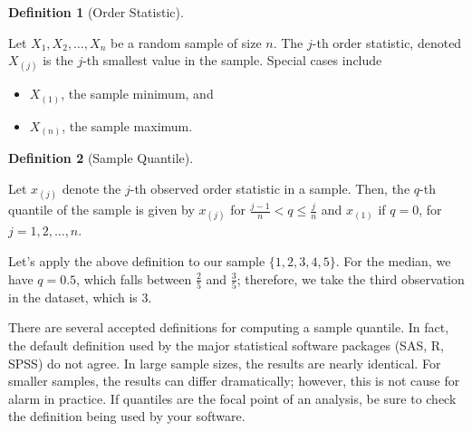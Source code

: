 \documentclass[
  letterpaper,
  DIV=11,
  numbers=noendperiod]{scrreprt}
\providecommand{\tightlist}{%
  \setlength{\itemsep}{0pt}\setlength{\parskip}{0pt}}\usepackage{longtable,booktabs,array}
\theoremstyle{plain}
\theoremstyle{definition}
\newtheorem{definition}{Definition}[chapter]
\theoremstyle{definition}
\theoremstyle{remark}
\begin{document}
\begin{definition}[Order
Statistic]\protect\hypertarget{def-order-statistic}{}\label{def-order-statistic}

Let \(X_1, X_2, \dotsc, X_n\) be a random sample of size \(n\). The
\(j\)-th order statistic, denoted \(X_{(j)}\) is the \(j\)-th smallest
value in the sample. Special cases include

\begin{itemize}
\tightlist
\item
  \(X_{(1)}\), the sample minimum, and
\item
  \(X_{(n)}\), the sample maximum.
\end{itemize}

\end{definition}

\begin{definition}[Sample
Quantile]\protect\hypertarget{def-sample-quantile}{}\label{def-sample-quantile}

Let \(x_{(j)}\) denote the \(j\)-th observed order statistic in a
sample. Then, the \(q\)-th quantile of the sample is given by
\(x_{(j)}\) for \(\frac{j-1}{n} < q \leq \frac{j}{n}\) and \(x_{(1)}\)
if \(q = 0\), for \(j=1,2,\dotsc,n\).

\end{definition}

Let's apply the above definition to our sample \(\{1, 2, 3, 4, 5\}\).
For the median, we have \(q = 0.5\), which falls between \(\frac{2}{5}\)
and \(\frac{3}{5}\); therefore, we take the third observation in the
dataset, which is 3.

\begin{tcolorbox}[enhanced jigsaw, toprule=.15mm, left=2mm, title=\textcolor{quarto-callout-note-color}{\faInfo}\hspace{0.5em}{Note}, opacityback=0, toptitle=1mm, leftrule=.75mm, colbacktitle=quarto-callout-note-color!10!white, opacitybacktitle=0.6, titlerule=0mm, breakable, colframe=quarto-callout-note-color-frame, arc=.35mm, coltitle=black, bottomtitle=1mm, rightrule=.15mm, colback=white, bottomrule=.15mm]

There are several accepted definitions for computing a sample quantile.
In fact, the default definition used by the major statistical software
packages (SAS, R, SPSS) do not agree. In large sample sizes, the results
are nearly identical. For smaller samples, the results can differ
dramatically; however, this is not cause for alarm in practice. If
quantiles are the focal point of an analysis, be sure to check the
definition being used by your software.

\end{tcolorbox}
\end{document}
